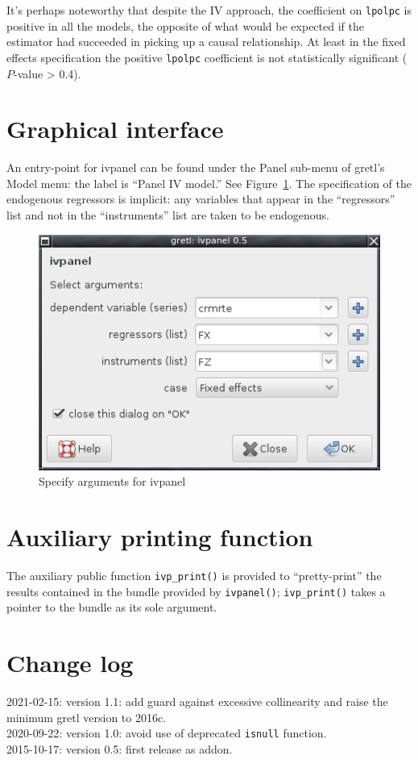\documentclass{article}
\begin{document}
It's perhaps noteworthy that despite the IV approach, the coefficient
on \texttt{lpolpc} is positive in all the models, the opposite of what
would be expected if the estimator had succeeded in picking up a
causal relationship. At least in the fixed effects specification the
positive \texttt{lpolpc} coefficient is not statistically significant
($P$-value > 0.4).

\section{Graphical interface}

An entry-point for \textsf{ivpanel} can be found under the
\textsf{Panel} sub-menu of gretl's \textsf{Model} menu: the label is
``Panel IV model.'' See Figure~\ref{fig:gui}. The specification of the
endogenous regressors is implicit: any variables that appear in the
``regressors'' list and not in the ``instruments'' list are taken to
be endogenous.

\begin{figure}[htbp]
  \centering
  \includegraphics[scale=0.6]{ivpanel-gui}
  \caption{Specify arguments for ivpanel}
  \label{fig:gui}
\end{figure}

\section{Auxiliary printing function}

The auxiliary public function \texttt{ivp\_print()} is provided to
``pretty-print'' the results contained in the bundle provided by
\texttt{ivpanel()}; \texttt{ivp\_print()} takes a pointer to the
bundle as its sole argument.

\section{Change log}

2021-02-15: version 1.1: add guard against excessive collinearity and
raise the minimum gretl version to 2016c.\\
2020-09-22: version 1.0: avoid use of deprecated \texttt{isnull}
function.\\
2015-10-17: version 0.5: first release as addon. \\



\end{document}
